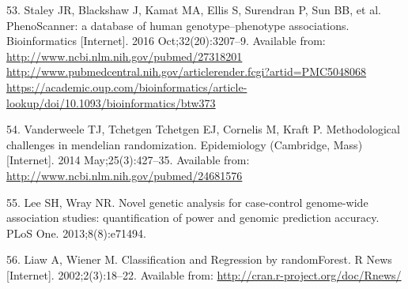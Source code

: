 \documentclass[]{article}
\begin{document}
\hypertarget{ref-Staley2016}{}
53. Staley JR, Blackshaw J, Kamat MA, Ellis S, Surendran P, Sun BB, et
al. PhenoScanner: a database of human genotype--phenotype associations.
Bioinformatics {[}Internet{]}. 2016 Oct;32(20):3207--9. Available from:
\href{http://www.ncbi.nlm.nih.gov/pubmed/27318201\%20http://www.pubmedcentral.nih.gov/articlerender.fcgi?artid=PMC5048068\%20https://academic.oup.com/bioinformatics/article-lookup/doi/10.1093/bioinformatics/btw373}{http://www.ncbi.nlm.nih.gov/pubmed/27318201 http://www.pubmedcentral.nih.gov/articlerender.fcgi?artid=PMC5048068 https://academic.oup.com/bioinformatics/article-lookup/doi/10.1093/bioinformatics/btw373}

\hypertarget{ref-Vanderweele2014}{}
54. Vanderweele TJ, Tchetgen Tchetgen EJ, Cornelis M, Kraft P.
Methodological challenges in mendelian randomization. Epidemiology
(Cambridge, Mass) {[}Internet{]}. 2014 May;25(3):427--35. Available
from: \url{http://www.ncbi.nlm.nih.gov/pubmed/24681576}

\hypertarget{ref-Lee2013c}{}
55. Lee SH, Wray NR. Novel genetic analysis for case-control genome-wide
association studies: quantification of power and genomic prediction
accuracy. PLoS One. 2013;8(8):e71494.

\hypertarget{ref-Liaw2002}{}
56. Liaw A, Wiener M. Classification and Regression by randomForest. R
News {[}Internet{]}. 2002;2(3):18--22. Available from:
\url{http://cran.r-project.org/doc/Rnews/}
\end{document}
